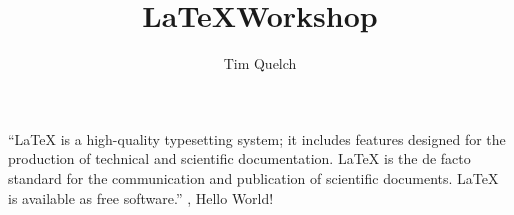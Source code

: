 \documentclass{article}
\title{\LaTeX Workshop}
\author{Tim Quelch}
\begin{document}
\maketitle

``LaTeX is a high-quality typesetting system; it includes features designed for the production of technical and scientific documentation. LaTeX is the de facto standard for the communication and publication of scientific documents. LaTeX is available as free software.'' \cite{latex_project_latex_????},
Hello World!

\printbibliography
\end{document}
